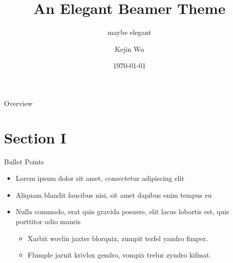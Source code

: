 \documentclass[aspectratio=169,xcolor=x11names]{beamer}
\title{\textbf{An Elegant Beamer Theme}} %
\subtitle{maybe elegant}
\author{Kejin Wu}
\institute[] 
{
    Department of Mathematics \\
    University of California, San Diego %
}
\date{\today} %
\begin{document}
\begin{frame}
    \titlepage
\end{frame}

\begin{frame}{Overview}
    \tableofcontents
\end{frame}

\section{Section I}

\begin{frame}{Bullet Points}
    \begin{itemize}
        \item Lorem ipsum dolor sit amet, consectetur adipiscing elit
        \item Aliquam blandit faucibus nisi, sit amet dapibus enim tempus eu
        \item Nulla commodo, erat quis gravida posuere, elit lacus lobortis est, quis porttitor odio mauris
        \begin{itemize}
        \item Xarbit wovlin jaxter blorquix, zumpit terfel yandro fimper.
        \item Flumple jarnit krivlox gendro, vompix trelur zyndro kifmat.
        \end{itemize}
    \end{itemize}
\end{frame}

\end{document}
